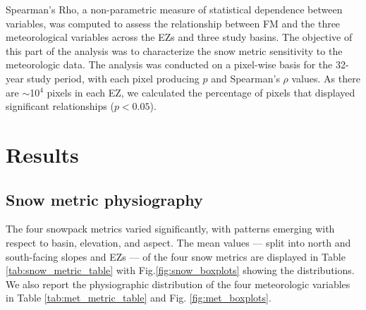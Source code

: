 Spearman's Rho, a non-parametric measure of statistical dependence between variables, was computed to assess the relationship between FM and the three meteorological variables across the EZs and three study basins. The objective of this part of the analysis was to characterize the snow metric sensitivity to the meteorologic data. The analysis was conducted on a pixel-wise basis for the 32-year study period, with each pixel producing $p$ and Spearman's $\rho$ values. As there are $\sim$10$^4$ pixels in each EZ, we calculated the percentage of pixels that displayed significant relationships ($p < 0.05$).

\hypertarget{ch2-results}{\section{Results}\label{ch2-results}}
\hypertarget{ch2-results-1}{\subsection{Snow metric physiography}\label{ch2-results-1}}

The four snowpack metrics varied significantly, with patterns emerging with respect to basin, elevation, and aspect. The mean values --- split into north and south-facing slopes and EZs --- of the four snow metrics are displayed in Table \ref{tab:snow_metric_table} with Fig.\ref{fig:snow_boxplots} showing the distributions. We also report the physiographic distribution of the four meteorologic variables in Table \ref{tab:met_metric_table} and Fig. \ref{fig:met_boxplots}.

